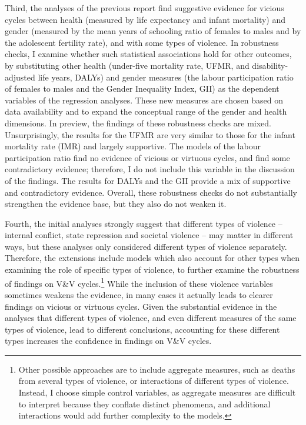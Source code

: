 \documentclass[12pt]{article}
\begin{document}
Third, the analyses of the previous report find suggestive evidence for vicious cycles between health (measured by life expectancy and infant mortality) and gender (measured by the mean years of schooling ratio of females to males and by the adolescent fertility rate), and with some types of violence. In robustness checks, I examine whether such statistical associations hold for other outcomes, by substituting other health (under-five mortality rate, UFMR, and disability-adjusted life years, DALYs) and gender measures (the labour participation ratio of females to males and the Gender Inequality Index, GII) as the dependent variables of the regression analyses. These new measures are chosen based on data availability and to expand the conceptual range of the gender and health dimensions. In preview, the findings of these robustness checks are mixed. Unsurprisingly, the results for the UFMR are very similar to those for the infant mortality rate (IMR) and largely supportive. The models of the labour participation ratio find no evidence of vicious or virtuous cycles, and find some contradictory evidence; therefore, I do not include this variable in the discussion of the findings. The results for DALYs and the GII provide a mix of supportive and contradictory evidence. Overall, these robustness checks do not substantially strengthen the evidence base, but they also do not weaken it.

Fourth, the initial analyses strongly suggest that different types of violence -- internal conflict, state repression and societal violence -- may matter in different ways, but these analyses only considered different types of violence separately. Therefore, the extensions include models which also account for other types when examining the role of specific types of violence, to further examine the robustness of findings on V\&V cycles.\footnote{Other possible approaches are to include aggregate measures, such as deaths from several types of violence, or interactions of different types of violence. Instead,  I choose simple control variables, as aggregate measures are difficult to interpret because they conflate distinct phenomena, and additional interactions would add further complexity to the models.} While the inclusion of these violence variables sometimes weakens the evidence, in many cases it actually leads to clearer findings on vicious or virtuous cycles. Given the substantial evidence in the analyses that different types of violence, and even different measures of the same types of violence, lead to different conclusions, accounting for these different types increases the confidence in findings on V\&V cycles.
\end{document}
